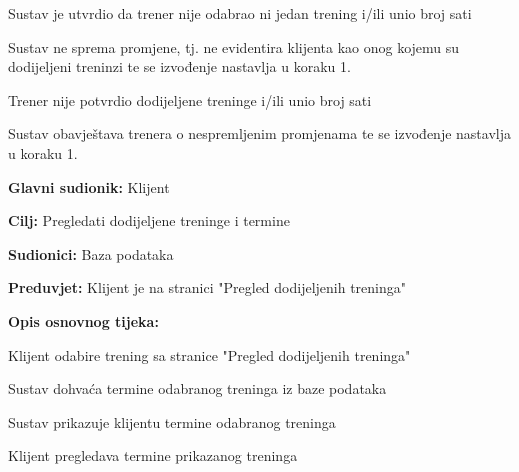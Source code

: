\begin{packed_item}
\begin{packed_item}
      						\item[6.a] Sustav je utvrdio da trener nije odabrao ni jedan trening i/ili unio broj sati
							\item[] \begin{packed_enum}
								
								\item Sustav ne sprema promjene, tj. ne evidentira klijenta kao onog kojemu su dodijeljeni treninzi te se izvođenje nastavlja u koraku 1.					
							\end{packed_enum}
	
							\item[5.a] Trener nije potvrdio dodijeljene treninge i/ili unio broj sati
							\item[] \begin{packed_enum}
								
								\item Sustav obavještava trenera o nespremljenim promjenama te se izvođenje nastavlja u koraku 1.
							\end{packed_enum}
                        \end{packed_item}
                    \end{packed_item}
                    

					
					\noindent {}
					\begin{packed_item}
	
						\item \textbf{Glavni sudionik: } Klijent
						\item  \textbf{Cilj:} Pregledati dodijeljene treninge i termine
						\item  \textbf{Sudionici:} Baza podataka
						\item  \textbf{Preduvjet:} Klijent je na stranici "Pregled dodijeljenih treninga"
						\item  \textbf{Opis osnovnog tijeka:}
						
						\item[] \begin{packed_enum}
	                        
							\item Klijent odabire trening sa stranice "Pregled dodijeljenih treninga"
							\item Sustav dohvaća termine odabranog treninga iz baze podataka
							\item Sustav prikazuje klijentu termine odabranog treninga
							\item Klijent pregledava termine prikazanog treninga
							
							
						\end{packed_enum}
						
						
					\end{packed_item}


